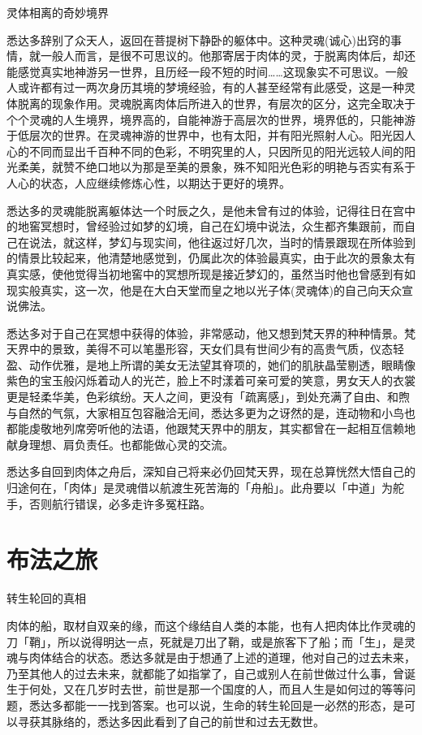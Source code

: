 \documentclass[12pt,twoside,openany]{book}
\begin{document}
灵体相离的奇妙境界

悉达多辞别了众天人，返回在菩提树下静卧的躯体中。这种灵魂(诚心)出窍的事情，就一般人而言，是很不可思议的。他那寄居于肉体的灵，于脱离肉体后，却还能感觉真实地神游另一世界，且历经一段不短的时间……这现象实不可思议。一般人或许都有过一两次身历其境的梦境经验，有的人甚至经常有此感受，这是一种灵体脱离的现象作用。灵魂脱离肉体后所进入的世界，有层次的区分，这完全取决于个个灵魂的人生境界，境界高的，自能神游于高层次的世界，境界低的，只能神游于低层次的世界。在灵魂神游的世界中，也有太阳，并有阳光照射人心。阳光因人心的不同而显出千百种不同的色彩，不明究里的人，只因所见的阳光远较人间的阳光柔美，就赞不绝口地以为那是至美的景象，殊不知阳光色彩的明艳与否实有系于人心的状态，人应继续修炼心性，以期达于更好的境界。

悉达多的灵魂能脱离躯体达一个时辰之久，是他未曾有过的体验，记得往日在宫中的地窖冥想时，曾经验过如梦的幻境，自己在幻境中说法，众生都齐集跟前，而自己在说法，就这样，梦幻与现实间，他往返过好几次，当时的情景跟现在所体验到的情景比较起来，他清楚地感觉到，仍属此次的体验最真实，由于此次的景象太有真实感，使他觉得当初地窖中的冥想所现是接近梦幻的，虽然当时他也曾感到有如现实般真实，这一次，他是在大白天堂而皇之地以光子体(灵魂体)的自己向天众宣说佛法。

悉达多对于自己在冥想中获得的体验，非常感动，他又想到梵天界的种种情景。梵天界中的景致，美得不可以笔墨形容，天女们具有世间少有的高贵气质，仪态轻盈、动作优雅，是地上所谓的美女无法望其脊项的，她们的肌肤晶莹剔透，眼睛像紫色的宝玉般闪烁着动人的光芒，脸上不时漾着可亲可爱的笑意，男女天人的衣裳更是轻柔华美，色彩缤纷。天人之间，更没有「疏离感」，到处充满了自由、和煦与自然的气氛，大家相互包容融洽无间，悉达多更为之讶然的是，连动物和小鸟也都能虔敬地列席旁听他的法语，他跟梵天界中的朋友，其实都曾在一起相互信赖地献身理想、肩负责任。也都能做心灵的交流。

悉达多自回到肉体之舟后，深知自己将来必仍回梵天界，现在总算恍然大悟自己的归途何在，「肉体」是灵魂借以航渡生死苦海的「舟船」。此舟要以「中道」为舵手，否则航行错误，必多走许多冤枉路。

\section{布法之旅}\label{sec1.19}

转生轮回的真相

肉体的船，取材自双亲的缘，而这个缘结自人类的本能，也有人把肉体比作灵魂的刀「鞘」，所以说得明达一点，死就是刀出了鞘，或是旅客下了船；而「生」，是灵魂与肉体结合的状态。悉达多就是由于想通了上述的道理，他对自己的过去未来，乃至其他人的过去未来，就都能了如指掌了，自己或别人在前世做过什么事，曾诞生于何处，又在几岁时去世，前世是那一个国度的人，而且人生是如何过的等等问题，悉达多都能一一找到答案。也可以说，生命的转生轮回是一必然的形态，是可以寻获其脉络的，悉达多因此看到了自己的前世和过去无数世。
\end{document}
